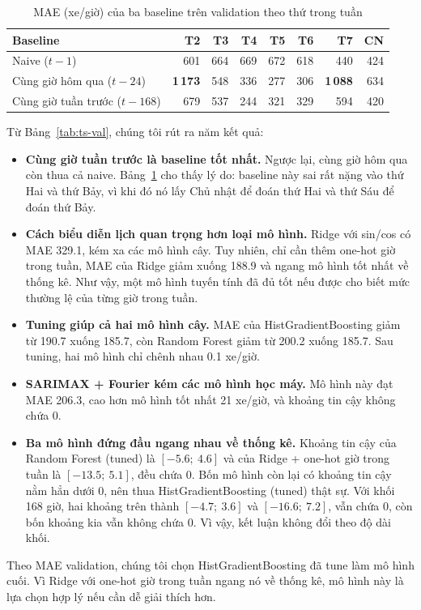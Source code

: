 \begin{table}[H]
\centering
\caption{MAE (xe/giờ) của ba baseline trên validation theo thứ trong tuần}
\label{tab:ts-weekday}
\small
\begin{tabular}{lrrrrrrr}
\toprule
Baseline & T2 & T3 & T4 & T5 & T6 & T7 & CN\\
\midrule
Naive ($t-1$) & 601 & 664 & 669 & 672 & 618 & 440 & 424\\
Cùng giờ hôm qua ($t-24$) & \textbf{1\,173} & 548 & 336 & 277 & 306 & \textbf{1\,088} & 634\\
Cùng giờ tuần trước ($t-168$) & 679 & 537 & 244 & 321 & 329 & 594 & 420\\
\bottomrule
\end{tabular}
\end{table}

Từ Bảng~\ref{tab:ts-val}, chúng tôi rút ra năm kết quả:
\begin{itemize}[leftmargin=1.5cm]
    \item \textbf{Cùng giờ tuần trước là baseline tốt nhất.} Ngược lại, cùng giờ hôm qua còn thua cả naive. Bảng~\ref{tab:ts-weekday} cho
          thấy lý do: baseline này sai rất nặng vào thứ Hai và thứ Bảy, vì khi đó nó lấy Chủ nhật để đoán thứ Hai và thứ Sáu để đoán thứ Bảy.
    \item \textbf{Cách biểu diễn lịch quan trọng hơn loại mô hình.} Ridge với sin/cos có MAE 329.1, kém xa các mô hình cây. Tuy nhiên, chỉ
          cần thêm one-hot giờ trong tuần, MAE của Ridge giảm xuống 188.9 và ngang mô hình tốt nhất về thống kê. Như vậy, một mô hình tuyến
          tính đã đủ tốt nếu được cho biết mức thường lệ của từng giờ trong tuần.
    \item \textbf{Tuning giúp cả hai mô hình cây.} MAE của HistGradientBoosting giảm từ 190.7 xuống 185.7, còn Random Forest giảm từ 200.2
          xuống 185.7. Sau tuning, hai mô hình chỉ chênh nhau 0.1 xe/giờ.
    \item \textbf{SARIMAX + Fourier kém các mô hình học máy.} Mô hình này đạt MAE 206.3, cao hơn mô hình tốt nhất 21 xe/giờ, và khoảng tin
          cậy không chứa 0.
    \item \textbf{Ba mô hình đứng đầu ngang nhau về thống kê.} Khoảng tin cậy của Random Forest (tuned) là $[-5.6;\ 4.6]$ và của Ridge +
          one-hot giờ trong tuần là $[-13.5;\ 5.1]$, đều chứa 0. Bốn mô hình còn lại có khoảng tin cậy nằm hẳn dưới 0, nên thua
          HistGradientBoosting (tuned) thật sự. Với khối 168 giờ, hai khoảng trên thành $[-4.7;\ 3.6]$ và $[-16.6;\ 7.2]$, vẫn chứa 0, còn
          bốn khoảng kia vẫn không chứa 0. Vì vậy, kết luận không đổi theo độ dài khối.
\end{itemize}
Theo MAE validation, chúng tôi chọn HistGradientBoosting đã tune làm mô hình cuối. Vì Ridge với one-hot giờ trong tuần ngang nó về thống kê,
mô hình này là lựa chọn hợp lý nếu cần dễ giải thích hơn.

